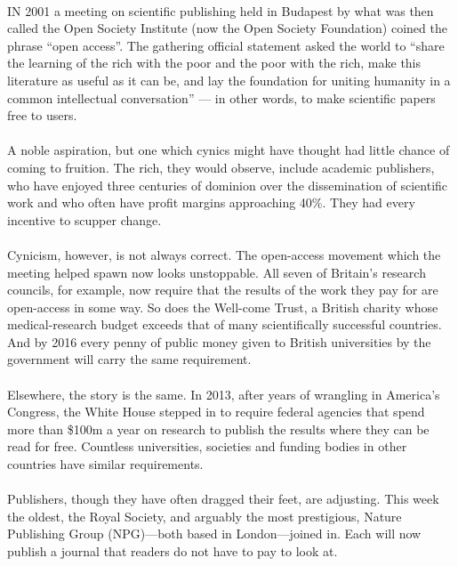 \documentclass[a4paper, 12pt, UTF8]{article}
\begin{document}
\paragraph*{}
    IN 2001 a meeting on scientific publishing held in Budapest by what was then called the Open Society Institute (now the Open Society Foundation) coined the phrase “open access”. The gathering official statement asked the world to “share the learning of the rich with the poor and the poor with the rich, make this literature as useful as it can be, and lay the foundation for uniting humanity in a common intellectual conversation” --- in other words, to make scientific papers free to users.

\paragraph*{}
    A noble aspiration, but one which cynics might have thought had little chance of coming to fruition. The rich, they would observe, include academic publishers, who have enjoyed three centuries of dominion over the dissemination of scientific work and who often have profit margins approaching 40\%. They had every incentive to scupper change.

\paragraph*{}
    Cynicism, however, is not always correct. The open-access movement which the meeting helped spawn now looks unstoppable. All seven of Britain’s research councils, for example, now require that the results of the work they pay for are open-access in some way. So does the Well-come Trust, a British charity whose medical-research budget exceeds that of many scientifically successful countries. And by 2016 every penny of public money given to British universities by the government will carry the same requirement.

\paragraph*{}
    Elsewhere, the story is the same. In 2013, after years of wrangling in America’s Congress, the White House stepped in to require federal agencies that spend more than \$100m a year on research to publish the results where they can be read for free. Countless universities, societies and funding bodies in other countries have similar requirements.

\paragraph*{}
    Publishers, though they have often dragged their feet, are adjusting. This week the oldest, the Royal Society, and arguably the most prestigious, Nature Publishing Group (NPG)—both based in London—joined in. Each will now publish a journal that readers do not have to pay to look at.
\end{document}
